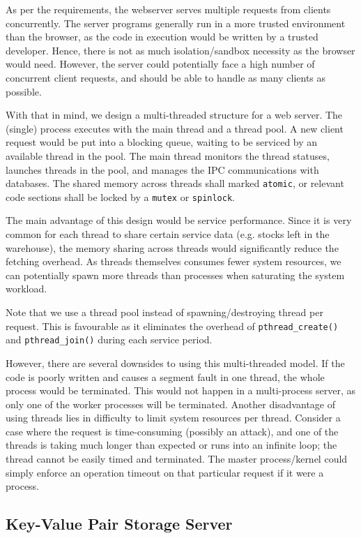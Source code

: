 \documentclass[12pt]{article}
\begin{document}
As per the requirements, the webserver serves multiple requests from clients concurrently. The server programs generally run in a more trusted environment than the browser, as the code in execution would be written by a trusted developer. Hence, there is not as much isolation/sandbox necessity as the browser would need. However, the server could potentially face a high number of concurrent client requests, and should be able to handle as many clients as possible.

With that in mind, we design a multi-threaded structure for a web server. The (single) process executes with the main thread and a thread pool. A new client request would be put into a blocking queue, waiting to be serviced by an available thread in the pool. The main thread monitors the thread statuses, launches threads in the pool, and manages the IPC communications with databases. The shared memory across threads shall marked \texttt{atomic}, or relevant code sections shall be locked by a \texttt{mutex} or \texttt{spinlock}.

The main advantage of this design would be service performance. Since it is very common for each thread to share certain service data (e.g. stocks left in the warehouse), the memory sharing across threads would significantly reduce the fetching overhead. As threads themselves consumes fewer system resources, we can potentially spawn more threads than processes when saturating the system workload.

Note that we use a thread pool instead of spawning/destroying thread per request. This is favourable as it eliminates the overhead of \texttt{pthread\_create()} and \texttt{pthread\_join()} during each service period. 

However, there are several downsides to using this multi-threaded model. If the code is poorly written and causes a segment fault in one thread, the whole process would be terminated. This would not happen in a multi-process server, as only one of the worker processes will be terminated. Another disadvantage of using threads lies in difficulty to limit system resources per thread. Consider a case where the request is time-consuming (possibly an attack), and one of the threads is taking much longer than expected or runs into an infinite loop; the thread cannot be easily timed and terminated. The master process/kernel could simply enforce an operation timeout on that particular request if it were a process.

\subsection{Key-Value Pair Storage Server}
\end{document}

